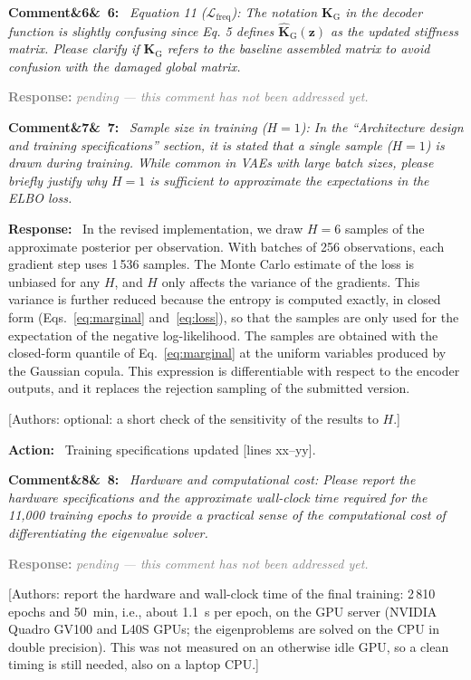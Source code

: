 \documentclass[11pt]{article}
\newenvironment{rcomment}[1]{\par\bigskip\noindent\textbf{Comment\ifx&#1&\else\ #1\fi:}\ \itshape}{\par}
\newenvironment{response}{\par\smallskip\noindent\color{resp}\textbf{Response:}\ }{\par}
\newenvironment{action}{\par\smallskip\noindent\color{resp}\textbf{Action:}\ }{\par}
\newcommand{\pending}{\par\smallskip\noindent\textcolor{gray}{\textbf{Response:} \textit{pending --- this comment
has not been addressed yet.}}\par}
\newcommand{\authornote}[1]{\textcolor{note}{\textsf{[Authors: #1]}}}
\newcommand{\tbd}[1]{\textcolor{note}{\textsf{[#1]}}}
\newcommand{\lines}[1]{\tbd{lines #1}}
\newcommand{\z}{\mathbf{z}}
\begin{document}
\begin{rcomment}{6}
Equation 11 ($\mathcal{L}_{\mathrm{freq}}$): The notation $\mathbf{K}_{\mathrm{G}}$ in the decoder function is slightly
confusing since Eq. 5 defines $\hat{\mathbf{K}}_{\mathrm{G}}(\z)$ as the updated stiffness matrix. Please clarify if
$\mathbf{K}_{\mathrm{G}}$ refers to the baseline assembled matrix to avoid confusion with the damaged global matrix.
\end{rcomment}
\pending

\begin{rcomment}{7}
Sample size in training ($H=1$): In the ``Architecture design and training specifications'' section, it is stated that
a single sample ($H=1$) is drawn during training. While common in VAEs with large batch sizes, please briefly justify why
$H=1$ is sufficient to approximate the expectations in the ELBO loss.
\end{rcomment}

\begin{response}
In the revised implementation, we draw $H=6$ samples of the approximate posterior per observation. With batches of 256
observations, each gradient step uses 1\,536 samples. The Monte Carlo estimate of the loss is unbiased for any $H$, and
$H$ only affects the variance of the gradients. This variance is further reduced because the entropy is computed
exactly, in closed form (Eqs.~\eqref{eq:marginal} and~\eqref{eq:loss}), so that the samples are only used for the
expectation of the negative log-likelihood. The samples are obtained with the closed-form quantile of
Eq.~\eqref{eq:marginal} at the uniform variables produced by the Gaussian copula. This expression is differentiable with
respect to the encoder outputs, and it replaces the rejection sampling of the submitted version.
\end{response}
\authornote{optional: a short check of the sensitivity of the results to $H$.}

\begin{action}
Training specifications updated \lines{xx--yy}.
\end{action}

\begin{rcomment}{8}
Hardware and computational cost: Please report the hardware specifications and the approximate wall-clock time
required for the 11,000 training epochs to provide a practical sense of the computational cost of differentiating the
eigenvalue solver.
\end{rcomment}
\pending
\authornote{report the hardware and wall-clock time of the final training: 2\,810 epochs and 50~min, i.e., about 1.1~s per
epoch, on the GPU server (NVIDIA Quadro GV100 and L40S GPUs; the eigenproblems are solved on the CPU in double
precision). This was not measured on an otherwise idle GPU, so a clean timing is still needed, also on a laptop CPU.}
\end{document}
